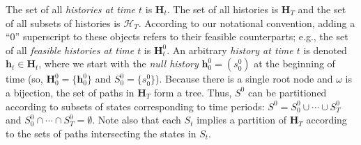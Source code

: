 \documentclass[
11pt,
titlepage,
reqno,
]{article}%
\theoremstyle{definition}
\begin{document}
	The set of all \textit{histories at time $t$} is $\mathbf{H}_t$.
	The set of all histories is $\mathbf{H}_T$ and the set of all subsets of histories is $\mathcal{H}_T$.
	According to our notational convention, adding a ``0'' superscript to these objects refers to their feasible counterparts; e.g., the set of all \textit{feasible histories at time $t$} is $\mathbf{H}^0_t$.
	An arbitrary \textit{history at time $t$} is denoted $\mathbf{h}_t\in \mathbf{H}_t$, where we start with the \textit{null history} $\mathbf{h}^0_0=(s^0_0)$ at the beginning of time (so, $\mathbf{H}^0_0=\{\mathbf{h}^0_0\}$ and  $S^0_0=\{s^0_0\}$).   
	Because there is a single root node and $\omega$ is a bijection, the set of paths in $\mathbf{H}_T$ form a tree.
	Thus, $S^0$ can be partitioned according to  subsets of states corresponding to time periods: $S^0=S^0_0\cup\cdots\cup S^0_T$ and $S^0_0\cap\cdots\cap S^0_T = \emptyset$.
	Note also that each $S_t$ implies a partition of $\mathbf{H}_T$ according to the sets of paths intersecting the states in $S_t$.

	 
	 

	 
\end{document}
